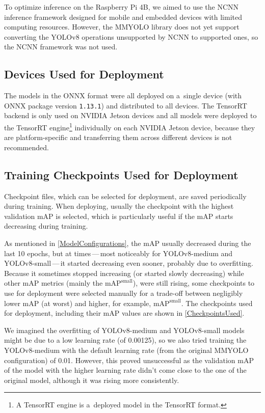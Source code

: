 To optimize inference on the Raspberry Pi 4B, we aimed to use the NCNN inference
framework designed for mobile and embedded devices with limited computing
resources. However, the MMYOLO library does not yet support converting the
YOLOv8 operations unsupported by NCNN to supported ones, so the NCNN framework
was not used.


\subsection*{Devices Used for Deployment}

The models in the ONNX format were all deployed on a~single device (with ONNX
package version \texttt{1.13.1}) and distributed to all devices. The TensorRT
backend is only used on NVIDIA Jetson devices and all models were deployed to
the TensorRT engine\footnote{A TensorRT engine is a~deployed model in the
TensorRT format.} individually on each NVIDIA Jetson device, because they are
platform-specific and transferring them across different devices is not
recommended.


\subsection*{Training Checkpoints Used for Deployment}

Checkpoint files, which can be selected for deployment, are saved periodically
during training. When deploying, usually the checkpoint with the highest
validation mAP is selected, which is particularly useful if the mAP starts
decreasing during training.

As mentioned in \autoref{ModelConfigurations}, the mAP usually decreased during
the last 10 epochs, but at times\,---\,most noticeably for YOLOv8-medium and
YOLOv8-small\,---\,it started decreasing even sooner, probably due to
overfitting. Because it sometimes stopped increasing (or started slowly
decreasing) while other mAP metrics (mainly the $\text{mAP}^{\text{small}}$),
were still rising, some checkpoints to use for deployment were selected manually
for a trade-off between negligibly lower mAP (at worst) and higher, for example,
$\text{mAP}^{\text{small}}$. The checkpoints used for deployment, including
their mAP values are shown in \autoref{CheckpointsUsed}.

We imagined the overfitting of YOLOv8-medium and YOLOv8-small models might be
due to a low learning rate (of 0.00125), so we also tried training the
YOLOv8-medium with the default learning rate (from the original MMYOLO
configuration) of 0.01. However, this proved unsuccessful as the validation mAP
of the model with the higher learning rate didn't come close to the one of the
original model, although it was rising more consistently.


